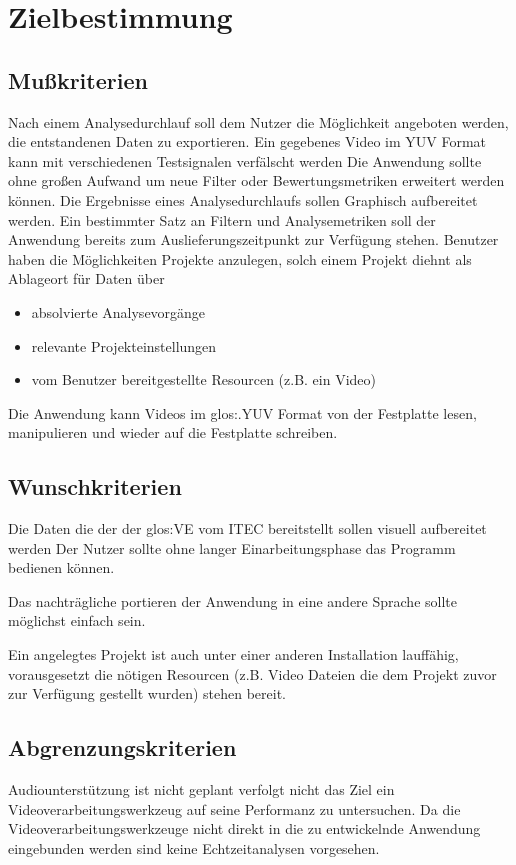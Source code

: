 \chapter{Zielbestimmung}

\section{Mußkriterien}

\newItemMK Nach einem Analysedurchlauf soll dem Nutzer die Möglichkeit angeboten werden, die entstandenen Daten zu exportieren. %
\newItemMK Ein gegebenes Video im YUV Format kann mit verschiedenen Testsignalen verfälscht werden %
\newItemMK Die Anwendung sollte ohne großen Aufwand um neue Filter oder Bewertungsmetriken erweitert werden können. %
\newItemMK Die Ergebnisse eines Analysedurchlaufs sollen Graphisch aufbereitet werden. %
\newItemMK Ein bestimmter Satz an Filtern und Analysemetriken soll der Anwendung bereits zum Auslieferungszeitpunkt zur Verfügung stehen.
\newItemMK Benutzer haben die Möglichkeiten Projekte anzulegen, solch einem Projekt diehnt als Ablageort für Daten über 
\begin{itemize}
\item absolvierte Analysevorgänge
\item relevante Projekteinstellungen
\item vom Benutzer bereitgestellte Resourcen (z.B. ein Video)
\end{itemize}
\newItemMK Die Anwendung kann Videos im \gls{glos:.YUV} Format von der Festplatte lesen, manipulieren und wieder auf die Festplatte schreiben.


\setcounter{enumi}{0}

\section{Wunschkriterien}

\newItemWK Die Daten die der der \gls{glos:VE} vom \gls{ITEC}  bereitstellt sollen visuell aufbereitet werden
\newItemWK Der Nutzer sollte ohne langer Einarbeitungsphase das Programm bedienen können.

\newItemWK Das nachträgliche portieren der Anwendung in eine andere Sprache sollte möglichst einfach sein.

\newItemWK Ein angelegtes Projekt ist auch unter einer anderen \projektTitel Installation lauffähig, vorausgesetzt die nötigen Resourcen (z.B. Video Dateien die dem Projekt zuvor zur Verfügung gestellt wurden) stehen bereit.

\setcounter{enumi}{0}

\section{Abgrenzungskriterien}

\newItemAK Audiounterstützung ist nicht geplant
\newItemAK \projektTitel verfolgt nicht das Ziel ein Videoverarbeitungswerkzeug auf seine Performanz zu untersuchen.
\newItemAK Da die Videoverarbeitungswerkzeuge nicht direkt in die zu entwickelnde Anwendung eingebunden werden sind keine Echtzeitanalysen vorgesehen.


\setcounter{enumi}{0}
